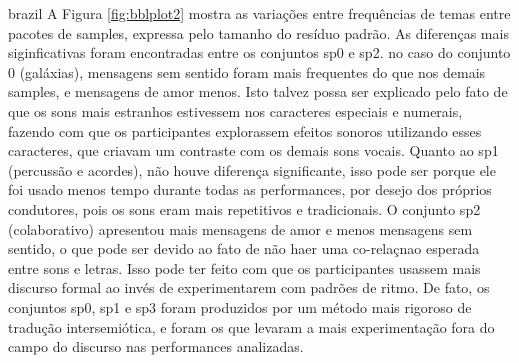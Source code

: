 \begin{otherlanguage*}{brazil}
A Figura \ref{fig:bblplot2} mostra as variações entre frequências de temas entre pacotes de samples, expressa pelo tamanho do resíduo padrão. As diferenças mais siginficativas foram encontradas entre os conjuntos sp0 e sp2. no caso do conjunto 0 (galáxias), mensagens sem sentido foram mais frequentes do que nos demais samples, e mensagens de amor menos. Isto talvez possa ser explicado pelo fato de que os sons mais estranhos estivessem nos caracteres especiais e numerais, fazendo com que os participantes explorassem efeitos sonoros utilizando esses caracteres, que criavam um contraste com os demais sons vocais. Quanto ao sp1 (percussão e acordes), não houve diferença significante, isso pode ser porque ele foi usado menos tempo durante todas as performances, por desejo dos próprios condutores, pois os sons eram mais repetitivos e tradicionais. O conjunto sp2 (colaborativo) apresentou mais mensagens de amor e menos mensagens sem sentido, o que pode ser devido ao fato de não haer uma co-relaçnao esperada entre sons e letras. Isso pode ter feito com que os participantes usassem mais discurso formal ao invés de experimentarem com padrões de ritmo. De fato, os conjuntos sp0, sp1 e sp3 foram produzidos por um método mais rigoroso de tradução intersemiótica, e foram os que levaram a mais experimentação fora do campo do discurso nas performances analizadas. 



\end{otherlanguage*}
